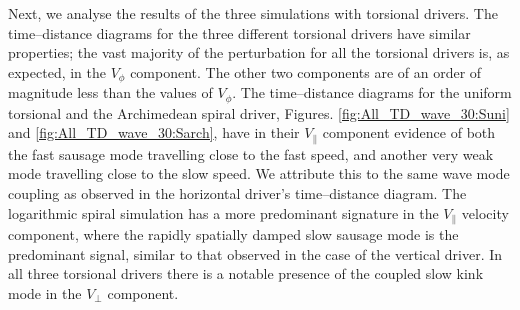 Next, we analyse the results of the three simulations with torsional drivers.
 The time--distance diagrams for the three different torsional drivers have similar properties; the vast majority of the perturbation for all the torsional drivers is, as expected, in the $V_\phi$ component.
 The other two components are of an order of magnitude less than the values of $V_\phi$.
 The time--distance diagrams for the uniform torsional and the Archimedean spiral driver, Figures. \ref{fig:All_TD_wave_30:Suni} and \ref{fig:All_TD_wave_30:Sarch}, have in their $V_\parallel$ component evidence of both the fast sausage mode travelling close to the fast speed, and another very weak mode travelling close to the slow speed.
 We attribute this to the same wave mode coupling as observed in the horizontal driver's time--distance diagram. 
 The logarithmic spiral simulation has a more predominant signature in the $V_\parallel$ velocity component, where the rapidly spatially damped slow sausage mode is the predominant signal, similar to that observed in the case of the vertical driver. 
 In all three torsional drivers there is a notable presence of the coupled slow kink mode in the $V_\perp$ component. 

%	
%	

